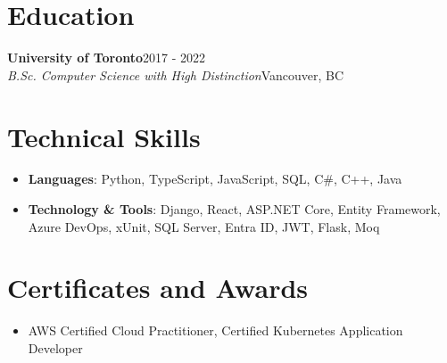\documentclass[11pt, letterpaper]{article}
\newcommand{\entry}[2]{%
    \noindent\textbf{#1}\hfill#2\\[0pt]%
}
\newcommand{\subentry}[2]{%
    \noindent\textit{#1}\hfill#2\\[-12pt]%
}
\begin{document}
\section{Education}

\entry{University of Toronto}{2017 - 2022}
\subentry{B.Sc. Computer Science with High Distinction}{Vancouver, BC}
\vspace{2pt}

\section{Technical Skills}

\begin{itemize}
    \item \textbf{Languages}: Python, TypeScript, JavaScript, SQL, C\#, C++, Java
    \item \textbf{Technology \& Tools}: Django, React, ASP.NET Core, Entity Framework, Azure DevOps, xUnit, SQL Server, Entra ID, JWT, Flask, Moq
\end{itemize}

\section{Certificates and Awards}

\begin{itemize}
    \item AWS Certified Cloud Practitioner, Certified Kubernetes Application Developer
\end{itemize}
\end{document}
